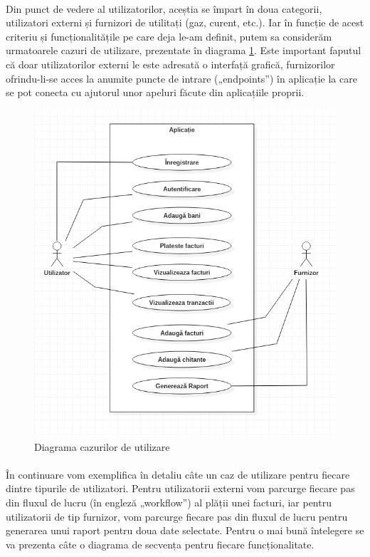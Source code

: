 \documentclass[12pt]{report}
\begin{document}
	\paragraph{}Din punct de vedere al utilizatorilor, aceștia se împart în doua categorii, utilizatori externi și furnizori de utilitați (gaz, curent, etc.). Iar în funcție de acest criteriu și funcționalitățile pe care deja le-am definit, putem sa considerăm urmatoarele cazuri de utilizare, prezentate în diagrama \ref{usediag}. Este important faputul că doar utilizatorilor externi le este adresată o interfață grafică, furnizorilor ofrindu-li-se acces la anumite puncte de intrare („endpoints”) în aplicație la care se pot conecta cu ajutorul unor apeluri făcute din aplicațiile proprii.
	\begin{figure}[h]
  	\centering
  	\includegraphics[scale=1]{usediag}
	\caption{Diagrama cazurilor de utilizare}  
	\label{usediag}
  	\end{figure}
  	\paragraph{}În continuare vom exemplifica în detaliu câte un caz de utilizare pentru fiecare dintre tipurile de utilizatori. Pentru utilizatorii externi vom parcurge fiecare pas din fluxul de lucru (în engleză „workflow”) al plății unei facturi, iar pentru utilizatorii de tip furnizor, vom parcurge fiecare pas din fluxul de lucru pentru generarea unui raport pentru doua date selectate. Pentru o mai bună întelegere se va prezenta câte o diagrama de secvența pentru fiecare funcționalitate.
\end{document}
